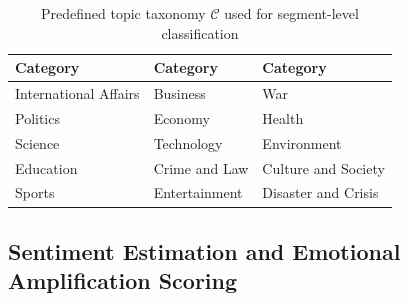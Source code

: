 \documentclass[final,1p,times]{elsarticle}
\begin{document}
\begin{table}[H]
\centering
\caption{Predefined topic taxonomy $\mathcal{C}$ used for segment-level classification}
\label{tab:taxonomy}
\small
\begin{tabular}{lll}
\hline
\textbf{Category} & \textbf{Category} & \textbf{Category} \\
\hline
International Affairs & Business & War \\
Politics & Economy & Health \\
Science & Technology & Environment \\
Education & Crime and Law & Culture and Society \\
Sports & Entertainment & Disaster and Crisis \\
\hline
\end{tabular}
\end{table}

\subsection{Sentiment Estimation and Emotional Amplification Scoring}
\end{document}
